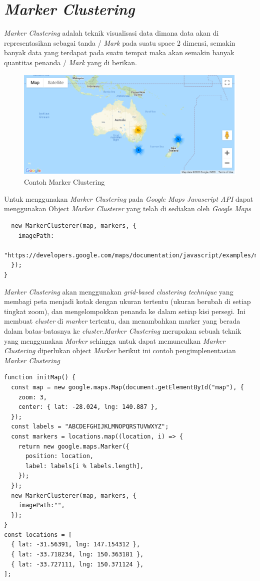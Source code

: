 \section{\textit{Marker Clustering}}
 \textit{Marker Clustering } adalah teknik visualisasi data dimana data akan di representasikan sebagai tanda / \textit{Mark} pada suatu space 2 dimensi, semakin banyak data yang terdapat pada suatu tempat maka akan semakin banyak quantitas penanda / \textit{Mark} yang di berikan. \cite{GoogleMarkerCluster:01:Maps}
  \begin{figure}[H]
    \centering
    \includegraphics[scale=0.5]{Gambar/marker_clustering.PNG}
    \caption{Contoh Marker Clustering}
    \label{fig:my_label}
\end{figure}
Untuk menggunakan \textit{Marker Clustering} pada \textit{Google Maps Javascript API} dapat menggunakan Object \textit{Marker Clusterer} yang telah di sediakan oleh \textit{Google Maps} 
  \begin{lstlisting}
  new MarkerClusterer(map, markers, {
    imagePath:
      "https://developers.google.com/maps/documentation/javascript/examples/markerclusterer/m",
  });
}
 \end{lstlisting}
 \textit{Marker Clustering} akan menggunakan   \textit{grid-based clustering technique} yang membagi peta menjadi kotak dengan ukuran tertentu (ukuran berubah di setiap tingkat zoom), dan mengelompokkan penanda ke dalam setiap kisi persegi. Ini membuat \textit{cluster} di \textit{marker} tertentu, dan menambahkan marker yang berada dalam batas-batasnya ke \textit{cluster}.\textit{Marker Clustering} merupakan sebuah teknik yang menggunakan \textit{Marker} sehingga untuk dapat memunculkan \textit{Marker Clustering} diperlukan object \textit{Marker}
 berikut ini contoh pengimplenentasian \textit{Marker Clustering} 
 
 \begin{lstlisting}
function initMap() {
  const map = new google.maps.Map(document.getElementById("map"), {
    zoom: 3,
    center: { lat: -28.024, lng: 140.887 },
  });
  const labels = "ABCDEFGHIJKLMNOPQRSTUVWXYZ";
  const markers = locations.map((location, i) => {
    return new google.maps.Marker({
      position: location,
      label: labels[i % labels.length],
    });
  });
  new MarkerClusterer(map, markers, {
    imagePath:"",
  });
}
const locations = [
  { lat: -31.56391, lng: 147.154312 },
  { lat: -33.718234, lng: 150.363181 },
  { lat: -33.727111, lng: 150.371124 },
];
\end{lstlisting}